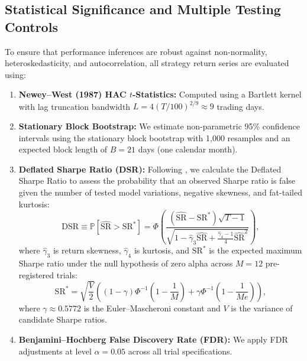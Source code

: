 \documentclass[11pt,a4paper]{article}
\begin{document}
\subsection{Statistical Significance and Multiple Testing Controls}
To ensure that performance inferences are robust against non-normality, heteroskedasticity, and autocorrelation, all strategy return series are evaluated using:
\begin{enumerate}
    \item \textbf{Newey--West (1987) HAC $t$-Statistics:} Computed using a Bartlett kernel with lag truncation bandwidth $L = 4(T/100)^{2/9} \approx 9$ trading days.
    \item \textbf{Stationary Block Bootstrap:} We estimate non-parametric 95\% confidence intervals using the \citet{politis1994stationary} stationary block bootstrap with 1,000 resamples and an expected block length of $B = 21$ days (one calendar month).
    \item \textbf{Deflated Sharpe Ratio (DSR):} Following \citet{bailey2014deflated}, we calculate the Deflated Sharpe Ratio to assess the probability that an observed Sharpe ratio is false given the number of tested model variations, negative skewness, and fat-tailed kurtosis:
    \begin{equation}
        \text{DSR} \equiv \mathbb{P}\left[ \widehat{\text{SR}} > \text{SR}^* \right] = \Phi\left( \frac{(\widehat{\text{SR}} - \text{SR}^*) \sqrt{T - 1}}{\sqrt{1 - \hat{\gamma}_3 \widehat{\text{SR}} + \frac{\hat{\gamma}_4 - 1}{4} \widehat{\text{SR}}^2}} \right),
        \label{eq:dsr_formula}
    \end{equation}
    where $\hat{\gamma}_3$ is return skewness, $\hat{\gamma}_4$ is kurtosis, and $\text{SR}^*$ is the expected maximum Sharpe ratio under the null hypothesis of zero alpha across $M=12$ pre-registered trials:
    \begin{equation}
        \text{SR}^* = \sqrt{\frac{V}{2}} \left( (1 - \gamma) \Phi^{-1}\left(1 - \frac{1}{M}\right) + \gamma \Phi^{-1}\left(1 - \frac{1}{M e}\right) \right),
        \label{eq:expected_max_sr}
    \end{equation}
    where $\gamma \approx 0.5772$ is the Euler--Mascheroni constant and $V$ is the variance of candidate Sharpe ratios.
    \item \textbf{Benjamini--Hochberg False Discovery Rate (FDR):} We apply \citet{benjamini1995controlling} FDR adjustments at level $\alpha = 0.05$ across all trial specifications.
\end{enumerate}
\end{document}

